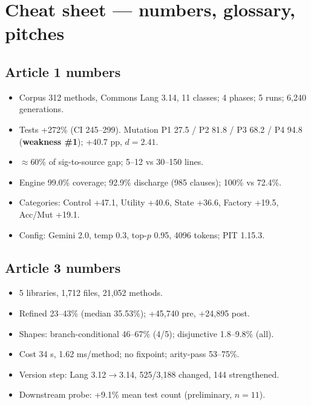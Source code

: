 \documentclass[11pt]{article}
\begin{document}
\section{Cheat sheet --- numbers, glossary, pitches}
\label{sec:cheat}

\subsection{Article 1 numbers}
\begin{itemize}[leftmargin=1.4em,itemsep=0.02em]
  \item Corpus 312 methods, Commons Lang 3.14, 11 classes; 4 phases; 5 runs;
        6{,}240 generations.
  \item Tests +272\% (CI 245--299). Mutation P1 27.5 / P2 81.8 / P3 68.2 /
        P4 94.8 (\textbf{weakness \#1}); +40.7 pp, $d=2.41$.
  \item $\approx$60\% of sig-to-source gap; 5--12 vs 30--150 lines.
  \item Engine 99.0\% coverage; 92.9\% discharge (985 clauses); 100\% vs 72.4\%.
  \item Categories: Control +47.1, Utility +40.6, State +36.6, Factory +19.5,
        Acc/Mut +19.1.
  \item Config: Gemini 2.0, temp 0.3, top-$p$ 0.95, 4096 tokens; PIT 1.15.3.
\end{itemize}

\subsection{Article 3 numbers}
\begin{itemize}[leftmargin=1.4em,itemsep=0.02em]
  \item 5 libraries, 1{,}712 files, 21{,}052 methods.
  \item Refined 23--43\% (median 35.53\%); +45{,}740 pre, +24{,}895 post.
  \item Shapes: branch-conditional 46--67\% (4/5); disjunctive 1.8--9.8\% (all).
  \item Cost 34 s, 1.62 ms/method; no fixpoint; arity-pass 53--75\%.
  \item Version step: Lang 3.12$\to$3.14, 525/3{,}188 changed, 144 strengthened.
  \item Downstream probe: +9.1\% mean test count (preliminary, $n=11$).
\end{itemize}
\end{document}
